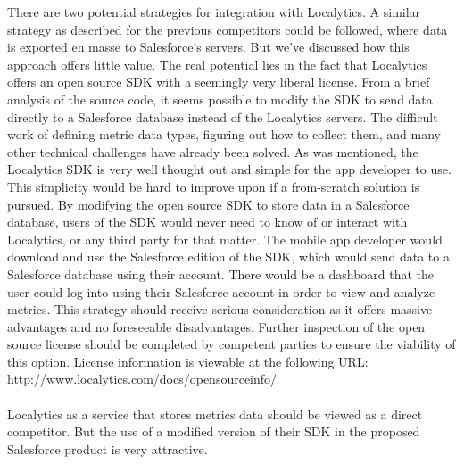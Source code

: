 \documentclass[12pt,oneside,letterpaper]{article}
\begin{document}
There are two potential strategies for integration with Localytics. A similar strategy as described for the previous competitors could be followed, where data is exported en masse to Salesforce's servers. But we've discussed how this approach offers little value. The real potential lies in the fact that Localytics offers an open source SDK with a seemingly very liberal license. From a brief analysis of the source code, it seems possible to modify the SDK to send data directly to a Salesforce database instead of the Localytics servers. The difficult work of defining metric data types, figuring out how to collect them, and many other technical challenges have already been solved. As was mentioned, the Localytics SDK is very well thought out and simple for the app developer to use. This simplicity would be hard to improve upon if a from-scratch solution is pursued. By modifying the open source SDK to store data in a Salesforce database, users of the SDK would never need to know of or interact with Localytics, or any third party for that matter. The mobile app developer would download and use the Salesforce edition of the SDK, which would send data to a Salesforce database using their account. There would be a dashboard that the user could log into using their Salesforce account in order to view and analyze metrics. This strategy should receive serious consideration as it offers massive advantages and no foreseeable disadvantages. Further inspection of the open source license should be completed by competent parties to ensure the viability of this option. License information is viewable at the following URL: \url{http://www.localytics.com/docs/opensourceinfo/}\\\\
Localytics as a service that stores metrics data should be viewed as a direct competitor. But the use of a modified version of their SDK in the proposed Salesforce product is very attractive.
\end{document}
